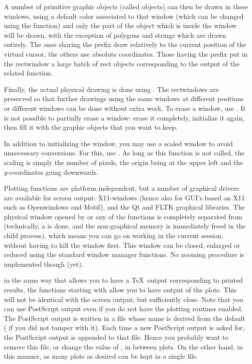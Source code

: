 A number of primitive graphic objects (called  objects) can then
be drawn in these windows, using a default color associated to that window
(which can be changed using the  function) and only the part
of the object which is inside the window will be drawn, with the exception of
polygons and strings which are drawn entirely. The ones sharing the prefix
 draw relatively to the current position of the virtual cursor,
the others use absolute coordinates. Those having the prefix 
put in the rectwindow a large batch of rect objects corresponding to the
output of the related  function.

   Finally, the actual physical drawing is done using . The
rectwindows are preserved so that further drawings using the same windows at
different positions or different windows can be done without extra work. To
erase a window, use . It is not possible to partially erase a
window: erase it completely, initialize it again, then fill it with the
graphic objects that you want to keep.

   In addition to initializing the window, you may use a scaled window to
avoid unnecessary conversions. For this, use . As long as this
function is not called, the scaling is simply the number of pixels, the
origin being at the upper left and the $y$-coordinates going downwards.

   Plotting functions are platform independent, but a number of graphical
drivers are available for screen output: X11-windows (hence also for GUI's
based on X11 such as Openwindows and Motif), and the Qt and FLTK graphical
libraries. The physical window opened by  or any of the
 functions is completely separated from  (technically, a
 is done, and the non-graphical memory is immediately freed in the
child process), which means you can go on working in the current 
session, without having to kill the window first. This window can be closed,
enlarged or reduced using the standard window manager functions. No zooming
procedure is implemented though (yet).

 in the same way that  allows you to have a \TeX\ output
corresponding to printed results, the functions starting with  allow
you to have  output of the plots. This will not be identical
with the screen output, but sufficiently close. Note that you can use
PostScript output even if you do not have the plotting routines enabled. The
PostScript output is written in a file whose name is derived from the
 default ( if you did not tamper with it). Each
time a new PostScript output is asked for, the PostScript output is appended
to that file. Hence you probably want to remove this file, or change the
value of , in between plots. On the other hand, in this manner,
as many plots as desired can be kept in a single file. \smallskip

